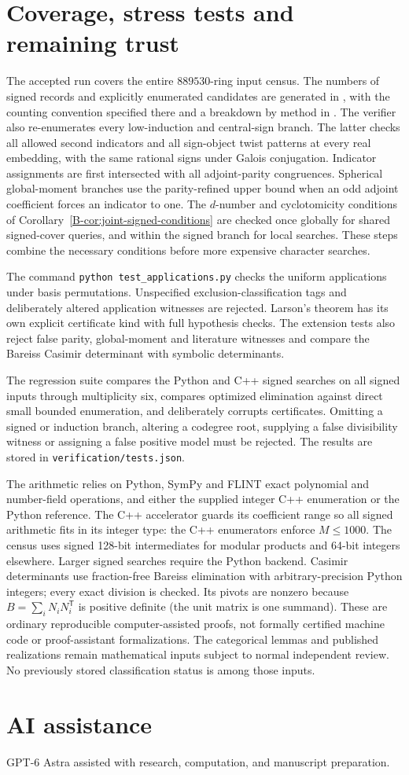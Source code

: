 \documentclass[11pt]{article}
\begin{document}
\section{Coverage, stress tests and remaining trust}
The accepted run covers the entire $889530$-ring input census. The
numbers of signed records and explicitly enumerated candidates are
generated in , with the counting
convention specified there and a breakdown by method in
. The verifier also re-enumerates every
low-induction and central-sign branch. The latter checks all allowed
second indicators and all sign-object twist patterns at every real
embedding, with the same rational signs under Galois conjugation.
Indicator assignments are first intersected with all adjoint-parity
congruences. Spherical global-moment branches use the parity-refined
upper bound when an odd adjoint coefficient forces an indicator to one.
The $d$-number and cyclotomicity conditions of
Corollary~\ref{B-cor:joint-signed-conditions} are checked once globally
for shared signed-cover queries, and within the signed branch for
local searches. These steps combine
the necessary conditions before more expensive character searches.

The command \texttt{python test\_applications.py} checks the uniform
applications under basis permutations. Unspecified exclusion-classification tags and deliberately altered
application witnesses are rejected. Larson's theorem has its own explicit
certificate kind with full hypothesis checks. The extension tests also
reject false parity, global-moment and literature witnesses and compare the
Bareiss Casimir determinant with symbolic determinants.

The regression suite compares the Python and C++ signed searches on all
signed inputs through multiplicity six, compares optimized elimination
against direct small bounded enumeration, and deliberately corrupts
certificates. Omitting a signed or induction branch, altering a codegree
root, supplying a false divisibility witness or assigning a false positive
model must be rejected. The results are stored in
\texttt{verification/tests.json}.

The arithmetic relies on Python, SymPy and FLINT exact polynomial and
number-field operations, and either the supplied integer C++ enumeration
or the Python reference. The C++ accelerator guards its coefficient range so all signed
arithmetic fits in its integer type: the C++ enumerators enforce
$M\leq1000$. The census uses signed 128-bit intermediates for modular
products and 64-bit integers elsewhere. Larger signed searches require
the Python backend. Casimir determinants use fraction-free Bareiss
elimination with arbitrary-precision Python integers; every exact
division is checked. Its pivots are nonzero because
$B=\sum_iN_iN_i^{\mathsf T}$ is positive definite (the unit matrix
is one summand). These are ordinary reproducible computer-assisted proofs, not
formally certified machine code or proof-assistant formalizations. The
categorical lemmas and published realizations remain mathematical inputs
subject to normal independent review. No previously stored classification
status is among those inputs.
\section*{AI assistance}
GPT-6 Astra assisted with research, computation, and manuscript preparation.
\end{document}
